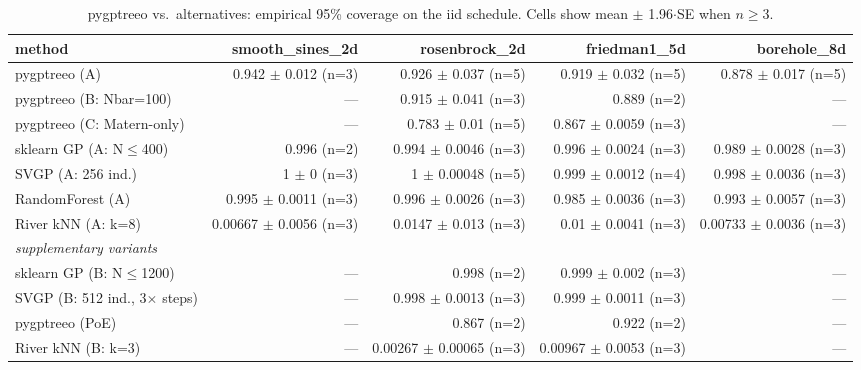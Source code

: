 \begin{table}[h]
\centering
\caption{pygptreeo vs.\ alternatives: empirical 95\% coverage on the iid schedule. Cells show mean $\pm$ 1.96$\cdot$SE when $n\geq 3$.}
\begin{tabular}{lrrrr}
\toprule
method & smooth\_sines\_2d & rosenbrock\_2d & friedman1\_5d & borehole\_8d \\
\midrule
pygptreeo (A) & 0.942 $\pm$ 0.012 (n=3) & 0.926 $\pm$ 0.037 (n=5) & 0.919 $\pm$ 0.032 (n=5) & 0.878 $\pm$ 0.017 (n=5) \\
pygptreeo (B: Nbar=100) & --- & 0.915 $\pm$ 0.041 (n=3) & 0.889 (n=2) & --- \\
pygptreeo (C: Matern-only) & --- & 0.783 $\pm$ 0.01 (n=5) & 0.867 $\pm$ 0.0059 (n=3) & --- \\
sklearn GP (A: N$\leq$400) & 0.996 (n=2) & 0.994 $\pm$ 0.0046 (n=3) & 0.996 $\pm$ 0.0024 (n=3) & 0.989 $\pm$ 0.0028 (n=3) \\
SVGP (A: 256 ind.) & 1 $\pm$ 0 (n=3) & 1 $\pm$ 0.00048 (n=5) & 0.999 $\pm$ 0.0012 (n=4) & 0.998 $\pm$ 0.0036 (n=3) \\
RandomForest (A) & 0.995 $\pm$ 0.0011 (n=3) & 0.996 $\pm$ 0.0026 (n=3) & 0.985 $\pm$ 0.0036 (n=3) & 0.993 $\pm$ 0.0057 (n=3) \\
River kNN (A: k=8) & 0.00667 $\pm$ 0.0056 (n=3) & 0.0147 $\pm$ 0.013 (n=3) & 0.01 $\pm$ 0.0041 (n=3) & 0.00733 $\pm$ 0.0036 (n=3) \\
\midrule
\multicolumn{5}{l}{\textit{supplementary variants}} \\
sklearn GP (B: N$\leq$1200) & --- & 0.998 (n=2) & 0.999 $\pm$ 0.002 (n=3) & --- \\
SVGP (B: 512 ind., 3$\times$ steps) & --- & 0.998 $\pm$ 0.0013 (n=3) & 0.999 $\pm$ 0.0011 (n=3) & --- \\
pygptreeo (PoE) & --- & 0.867 (n=2) & 0.922 (n=2) & --- \\
River kNN (B: k=3) & --- & 0.00267 $\pm$ 0.00065 (n=3) & 0.00967 $\pm$ 0.0053 (n=3) & --- \\
\bottomrule
\end{tabular}
\end{table}
